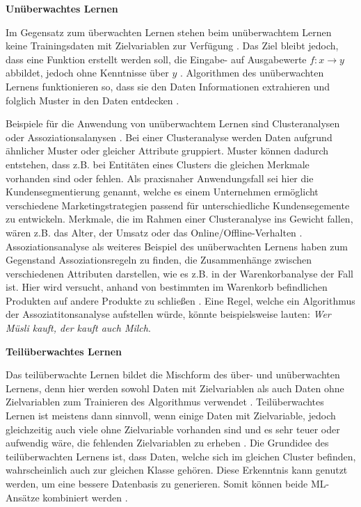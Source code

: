 \textbf{Unüberwachtes Lernen}
\begin{addmargin}[25pt]{0pt}
Im Gegensatz zum überwachten Lernen stehen beim unüberwachtem Lernen keine Trainingsdaten mit Zielvariablen zur Verfügung \cite{ayodele}. Das Ziel bleibt jedoch, dass eine Funktion erstellt werden soll, die Eingabe- auf Ausgabewerte $f:x \rightarrow y$ abbildet, jedoch ohne Kenntnisse über $y$ \cite{Alpaydin+2019}. Algorithmen des unüberwachten Lernens funktionieren so, dass sie den Daten Informationen extrahieren und folglich Muster in den Daten entdecken \cite{Choo.2020, Verdhan.2020}.

Beispiele für die Anwendung von unüberwachtem Lernen sind Clusteranalysen oder Assoziationsalanysen \cite{Wuttke.2022}. Bei einer Clusteranalyse werden Daten aufgrund ähnlicher Muster oder gleicher Attribute gruppiert. Muster können dadurch entstehen, dass z.B. bei Entitäten eines Clusters die gleichen Merkmale vorhanden sind oder fehlen. Als praxisnaher Anwendungsfall sei hier die Kundensegmentierung genannt, welche es einem Unternehmen ermöglicht verschiedene Marketingstrategien passend für unterschiedliche Kundensegemente zu entwickeln. Merkmale, die im Rahmen einer Clusteranalyse ins Gewicht fallen, wären z.B. das Alter, der Umsatz oder das Online/Offline-Verhalten \cite{Verdhan.2020}.
Assoziationsanalyse als weiteres Beispiel des unüberwachten Lernens haben zum Gegenstand Assoziationsregeln zu finden, die Zusammenhänge zwischen verschiedenen Attributen darstellen, wie es z.B. in der Warenkorbanalyse der Fall ist. Hier wird versucht, anhand von bestimmten im Warenkorb befindlichen Produkten auf andere Produkte zu schließen \cite{Cleve.2020}. Eine Regel, welche ein Algorithmus der Assoziatitonsanalyse aufstellen würde, könnte beispielsweise lauten: \textit{Wer Müsli kauft, der kauft auch Milch}.
\end{addmargin}

\textbf{Teilüberwachtes Lernen}
\begin{addmargin}[25pt]{0pt}
Das teilüberwachte Lernen bildet die Mischform des über- und unüberwachten Lernens, denn hier werden sowohl Daten mit Zielvariablen als auch Daten ohne Zielvariablen zum Trainieren des Algorithmus verwendet \cite{ayodele}. Teilüberwachtes Lernen ist meistens dann sinnvoll, wenn einige Daten mit Zielvariable, jedoch gleichzeitig auch viele ohne Zielvariable vorhanden sind und es sehr teuer oder aufwendig wäre, die fehlenden Zielvariablen zu erheben \cite{Wuttke.2022}. Die Grundidee des teilüberwachten Lernens ist, dass Daten, welche sich im gleichen Cluster befinden, wahrscheinlich auch zur gleichen Klasse gehören. Diese Erkenntnis kann genutzt werden, um eine bessere Datenbasis zu generieren. Somit können beide ML-Ansätze kombiniert werden \cite{Verdhan.2020}.
\end{addmargin}

